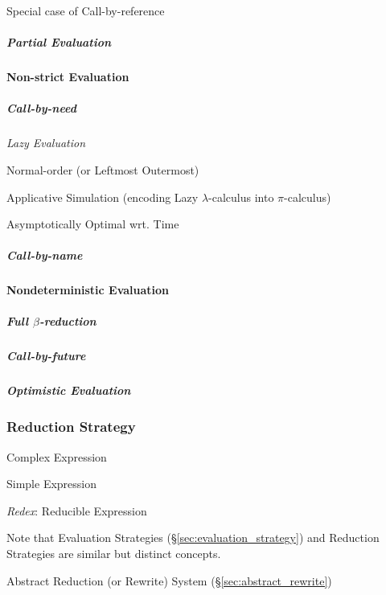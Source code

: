 Special case of Call-by-reference



\subparagraph{Partial Evaluation}\label{sec:partial_evaluation}\hfill



\paragraph{Non-strict Evaluation}\label{sec:nonstrict_evaluation}\hfill

\subparagraph{Call-by-need}\label{sec:call_by_need}\hfill

\emph{Lazy Evaluation}

Normal-order (or Leftmost Outermost)

Applicative Simulation (encoding Lazy $\lambda$-calculus into
$\pi$-calculus) \cite{milner92}

Asymptotically Optimal wrt. Time %



\subparagraph{Call-by-name}\label{sec:call_by_name}\hfill



\paragraph{Nondeterministic Evaluation}\hfill
\label{sec:nondeterministic_evaluation}



\subparagraph{Full $\beta$-reduction}\label{sec:full_beta_reduction}\hfill

\subparagraph{Call-by-future}\label{sec:call_by_future}\hfill

\subparagraph{Optimistic Evaluation}\label{sec:optimistic_evaluation}\hfill



\subsubsection{Reduction Strategy}\label{sec:reduction_strategy}

Complex Expression

Simple Expression

\emph{Redex}: Reducible Expression

\fist Note that Evaluation Strategies
(\S\ref{sec:evaluation_strategy}) and Reduction Strategies are similar
but distinct concepts.

Abstract Reduction (or Rewrite) System (\S\ref{sec:abstract_rewrite})

